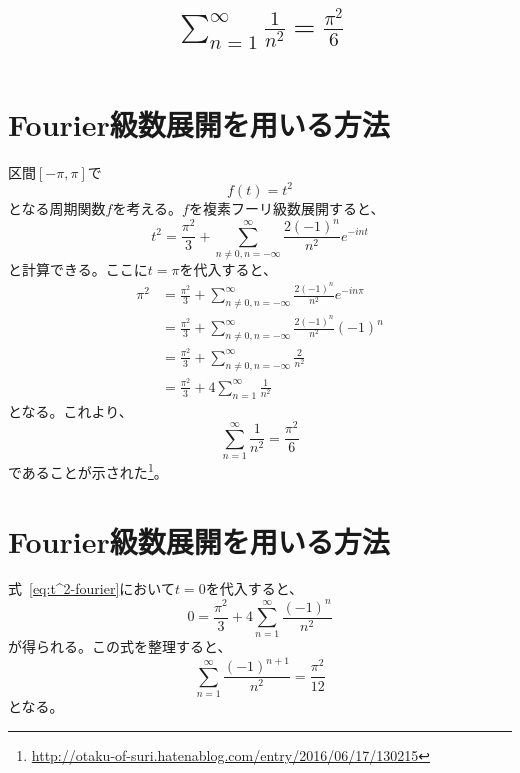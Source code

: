 \documentclass{jsarticle}
\title{$\displaystyle\sum_{n=1}^{\infty}\frac{1}{n^{2}}=\frac{\pi^{2}}{6}$}
\begin{document}
\maketitle


\tableofcontents

\newpage

\section{Fourier級数展開を用いる方法}
区間$[-\pi,\pi]$で
\begin{equation}
	f(t)=t^{2}
\end{equation}
となる周期関数$f$を考える。$f$を複素フーリ級数展開すると、
\begin{equation}
	t^{2}=\frac{\pi^{2}}{3}+\sum_{n\ne 0,n=-\infty}^{\infty}\frac{2(-1)^{n}}{n^{2}}e^{-int}
	\label{eq:t^2-fourier}
\end{equation}
と計算できる。ここに$t=\pi$を代入すると、
\begin{align}
	\pi^{2}&=\frac{\pi^{2}}{3}+\sum_{n\ne 0,n=-\infty}^{\infty}\frac{2(-1)^{n}}{n^{2}}e^{-in\pi}\\
	&=\frac{\pi^{2}}{3}+\sum_{n\ne 0,n=-\infty}^{\infty}\frac{2(-1)^{n}}{n^{2}}(-1)^{n}\\
	&=\frac{\pi^{2}}{3}+\sum_{n\ne 0,n=-\infty}^{\infty}\frac{2}{n^{2}}\\
	&=\frac{\pi^{2}}{3}+4\sum_{n=1}^{\infty}\frac{1}{n^{2}}
\end{align}
となる。これより、
\begin{equation}
	\sum_{n=1}^{\infty}\frac{1}{n^{2}}=\frac{\pi^{2}}{6}
\end{equation}
であることが示された\footnote{\url{http://otaku-of-suri.hatenablog.com/entry/2016/06/17/130215}}。

\newpage

\section{Fourier級数展開を用いる方法}
式~\eqref{eq:t^2-fourier}において$t=0$を代入すると、
\begin{equation}
	0=\frac{\pi^{2}}{3}+4\sum_{n=1}^{\infty}\frac{(-1)^{n}}{n^{2}}
\end{equation}
が得られる。この式を整理すると、
\begin{equation}
	\sum_{n=1}^{\infty}\frac{(-1)^{n+1}}{n^{2}}=\frac{\pi^{2}}{12}
\end{equation}
となる。
\end{document}
